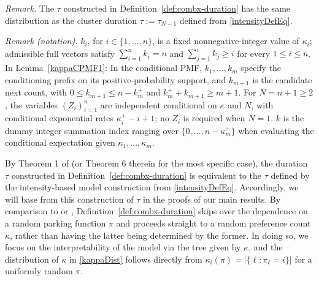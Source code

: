 \documentclass[opre,nonblindrev]{informs3_no_remark}
\newcommand{\tr}{\textcolor{red}}
\begin{document}
\noindent\textit{Remark.} The $\tau$ constructed in Definition~\ref{def:combx-duration} has the same distribution as the cluster duration $\tau:=\tau_{N-1}$ defined from \eqref{intensityDefEq}.

\noindent\textit{Remark (notation).} $k_i$, for $i\in\{1,\dots,n\}$, is a fixed nonnegative-integer value of $\kappa_i$; admissible full vectors satisfy $\sum_{i=1}^n k_i=n$ and $\sum_{j=1}^i k_j\geq i$ for every $1\leq i\leq n$. In Lemma~\ref{kappaCPMF1}: In the conditional PMF, $k_1,\dots,k_m$ specify the conditioning prefix on its positive-probability support, and $k_{m+1}$ is the candidate next count, with $0\leq k_{m+1}\leq n-k_m^+$ and $k_m^++k_{m+1}\geq m+1$. For $N=n+1\geq2$, the variables $(Z_i)_{i=1}^n$ are independent conditional on $\kappa$ and $N$, with conditional exponential rates $\kappa_i^+-i+1$; no $Z_i$ is required when $N=1$. $k$ is the dummy integer summation index ranging over $\{0,\dots,n-\kappa_m^+\}$ when evaluating the conditional expectation given $\kappa_1,\dots,\kappa_m$.


By Theorem 1 of \citet{daw2026asymmetries} (or Theorem 6 therein for the most specific case), the duration $\tau$ constructed in Definition~\ref{def:combx-duration} is equivalent to the $\tau$ defined by the intensity-based model construction from \eqref{intensityDefEq}. Accordingly, we will base from this construction of $\tau$ in the proofs of our main results. By comparison to \citet{daw2023conditional} or \citet{daw2026asymmetries}, Definition~\ref{def:combx-duration} skips over the dependence on a random parking function $\pi$ and proceeds straight to a random preference count $\kappa$, rather than having the latter being determined by the former. In doing so, we focus on the interpretability of the model via the tree given by $\kappa$, and the distribution of $\kappa$ in \eqref{kappaDist} follows directly from $\kappa_i(\pi) = |\{\ell : \pi_\ell = i \}|$ for a uniformly random $\pi$.


\end{document}
